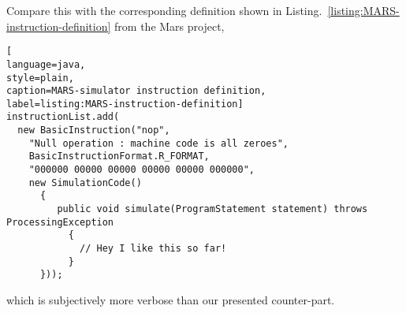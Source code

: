 Compare this with the corresponding definition shown in
Listing.~\ref{listing:MARS-instruction-definition} from the
Mars\cite{MARS-simulator} project,

\begin{lstlisting}[
language=java,
style=plain,
caption=MARS-simulator instruction definition,
label=listing:MARS-instruction-definition]
instructionList.add(
  new BasicInstruction("nop",
    "Null operation : machine code is all zeroes",
    BasicInstructionFormat.R_FORMAT,
    "000000 00000 00000 00000 00000 000000",
    new SimulationCode()
      {
         public void simulate(ProgramStatement statement) throws ProcessingException
           {
             // Hey I like this so far!
           }
      }));
\end{lstlisting}

which is subjectively more verbose than our presented counter-part.
